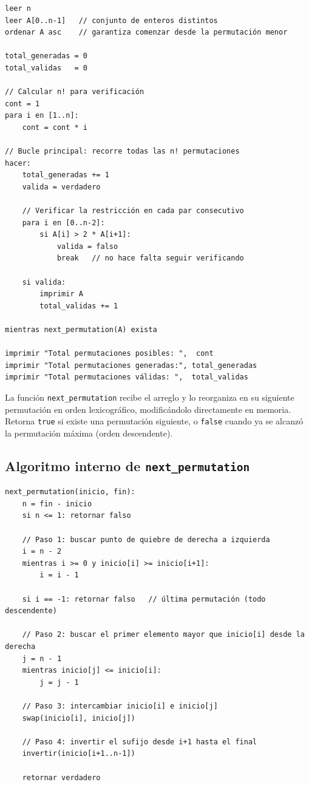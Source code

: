 \documentclass[12pt, a4paper]{article}
\begin{document}
\begin{lstlisting}[style=pseudo, caption={Pseudocódigo: Permutaciones con Restricción por Fuerza Bruta}]
leer n
leer A[0..n-1]   // conjunto de enteros distintos
ordenar A asc    // garantiza comenzar desde la permutación menor

total_generadas = 0
total_validas   = 0

// Calcular n! para verificación
cont = 1
para i en [1..n]:
    cont = cont * i

// Bucle principal: recorre todas las n! permutaciones
hacer:
    total_generadas += 1
    valida = verdadero

    // Verificar la restricción en cada par consecutivo
    para i en [0..n-2]:
        si A[i] > 2 * A[i+1]:
            valida = falso
            break   // no hace falta seguir verificando

    si valida:
        imprimir A
        total_validas += 1

mientras next_permutation(A) exista

imprimir "Total permutaciones posibles: ",  cont
imprimir "Total permutaciones generadas:", total_generadas
imprimir "Total permutaciones válidas: ",  total_validas
\end{lstlisting}

La función \texttt{next\_permutation} recibe el arreglo y lo reorganiza en su siguiente
permutación en orden lexicográfico, modificándolo directamente en memoria. Retorna
\texttt{true} si existe una permutación siguiente, o \texttt{false} cuando ya se alcanzó
la permutación máxima (orden descendente).

\subsection{Algoritmo interno de \texttt{next\_permutation}}

\begin{lstlisting}[style=pseudo, caption={Pseudocódigo interno: next\_permutation}]
next_permutation(inicio, fin):
    n = fin - inicio
    si n <= 1: retornar falso

    // Paso 1: buscar punto de quiebre de derecha a izquierda
    i = n - 2
    mientras i >= 0 y inicio[i] >= inicio[i+1]:
        i = i - 1

    si i == -1: retornar falso   // última permutación (todo descendente)

    // Paso 2: buscar el primer elemento mayor que inicio[i] desde la derecha
    j = n - 1
    mientras inicio[j] <= inicio[i]:
        j = j - 1

    // Paso 3: intercambiar inicio[i] e inicio[j]
    swap(inicio[i], inicio[j])

    // Paso 4: invertir el sufijo desde i+1 hasta el final
    invertir(inicio[i+1..n-1])

    retornar verdadero
\end{lstlisting}
\end{document}
